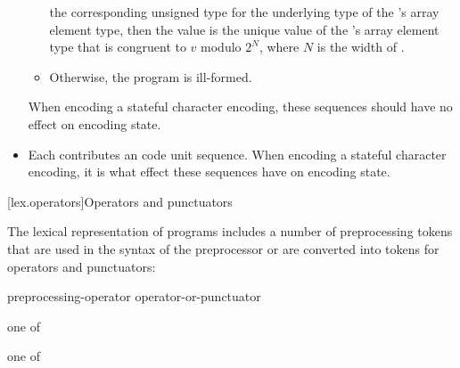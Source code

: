 \begin{itemize}
\begin{itemize}
the corresponding unsigned type for the underlying type of
the 's array element type,
then the value is the unique value of
the 's array element type 
that is congruent to $v$ modulo $2^N$, where $N$ is the width of .
\item
Otherwise, the program is ill-formed.
\end{itemize}
When encoding a stateful character encoding,
these sequences should have no effect on encoding state.
\item
Each 
contributes an
code unit sequence.
When encoding a stateful character encoding,
it is
what effect these sequences have on encoding state.
\end{itemize}

[lex.operators]{Operators and punctuators}

\pnum
{}%
%
The lexical representation of \Cpp{} programs includes a number of
preprocessing tokens that are used in the syntax of the preprocessor or
are converted into tokens for operators and punctuators:

\begin{bnf}
\br
    preprocessing-operator\br
    operator-or-punctuator
\end{bnf}

\begin{bnf}
\obeyspaces
{} \textnormal{one of}\br
    \terminal{\#        \#\#       \%:       \%:\%:}
\end{bnf}

\begin{bnf}
\obeyspaces
{} \textnormal{one of}\br
    \terminal{\{        \}        [        ]        (        )}\br
    \br
    \br
    \terminal{!        +        -        *        /        \%        \caret{}        \&        |}\br
    \terminal{=        +=       -=       *=       /=       \%=       \caret{}=       \&=       |=}\br
    \terminal{==       !=       <        >        <=       >=       <=>      \&\&       ||}\br
    \terminal{<<       >>       <<=      >>=      ++       --       ,}\br
    \br
\end{bnf}


